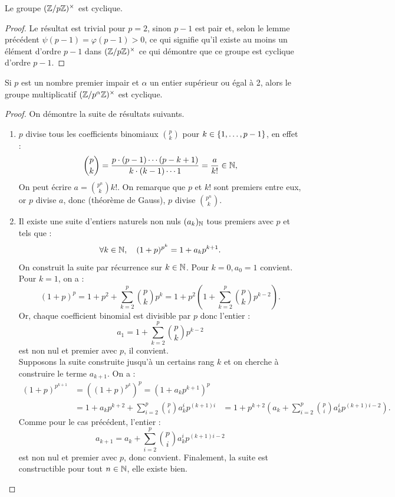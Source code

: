 \begin{coro}
Le groupe $(\mathbb{Z}/p\mathbb{Z})^{\times}$ est cyclique.
\end{coro}

\begin{proof}
Le résultat est trivial pour $p=2$, sinon $p-1$ est pair et, selon le lemme précédent $\psi(p-1)=\varphi(p-1) > 0$, ce qui signifie 
qu'il existe au moins un élément d'ordre $p-1$ dans $(\mathbb{Z}/p\mathbb{Z})^{\times}$ ce qui démontre que ce groupe est cyclique d'ordre $p-1$.
\end{proof}

\begin{thm}
Si $p$ est un nombre premier impair et $\alpha$ un entier supérieur ou égal à 2, alors le groupe multiplicatif $(\mathbb{Z}/p^{\alpha}\mathbb{Z})^{\times}$ est cyclique.
\end{thm}

\begin{proof}
On démontre la suite de résultats suivants.
\begin{enumerate}[label=(\roman*)]

\item
$p$ divise tous les coefficients binomiaux $\binom{p}{k}$ pour $k \in \{ 1, \dots, p-1 \}$, en effet :
\[ \binom{p}{k} = \dfrac{p \cdot (p-1) \cdots (p-k+1)}{k \cdot (k-1) \cdots 1} = \dfrac{a}{k!} \in \mathbb{N} , \]
On peut écrire $a = \binom{p^n}{k} k!$.
On remarque que $p$ et $k!$ sont premiers entre eux, or $p$ divise $a$, donc (théorème de Gauss), $p$ divise $\binom{p^n}{k}$.

\item
Il existe une suite d'entiers naturels non nuls $(a_k)_{\mathbb{N}}$ tous premiers avec $p$ et tels que :
\[ \forall k \in \mathbb{N}, \quad (1+p)^{p^k} = 1 + a_k p^{k+1} . \]
On construit la suite par récurrence sur $k \in \mathbb{N}$. Pour $k=0, a_0=1$ convient. \\
Pour $k=1$, on a :
\[ (1+p)^p = 1 + p^2 + \sum_{k=2}^p \binom{p}{k} p^k = 1 + p^2 ( 1 + \sum_{k=2}^p \binom{p}{k} p^{k-2} ) . \]
Or, chaque coefficient binomial est divisible par $p$ donc l'entier :
\[ a_1 = 1 + \sum_{k=2}^p \binom{p}{k} p^{k-2} \]
est non nul et premier avec $p$, il convient. \\
Supposons la suite construite jusqu'à un certains rang $k$ et on cherche à construire le terme $a_{k+1}$.
On a :
\begin{align*}
(1+p)^{p^{k+1}} & = \left ( (1 + p)^{p^k} \right )^p = \left ( 1 + a_k p^{k+1} \right )^p \\
 & = 1 + a_k p^{k+2} + \sum_{i=2}^p \binom{p}{i} a_k^i p^{(k+1)i} 
 & = 1 + p^{k+2} \left ( a_k + \sum_{i=2}^p \binom{p}{i} a_k^i p^{(k+1)i-2} \right ) .
\end{align*}
Comme pour le cas précédent, l'entier :
\[ a_{k+1} =  a_k + \sum_{i=2}^p \binom{p}{i} a_k^i p^{(k+1)i-2} \]
est non nul et premier avec $p$, donc convient. Finalement, la suite est constructible pour tout $n \in \mathbb{N}$, elle existe bien.


\end{enumerate}
\end{proof}
